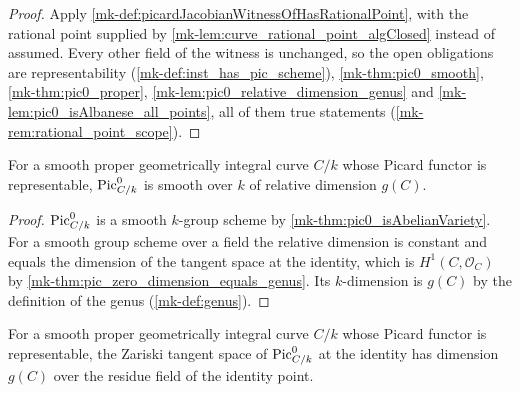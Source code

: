 \begin{proof}
  Apply \ref{mk-def:picardJacobianWitnessOfHasRationalPoint}, with the rational point
  supplied by \ref{mk-lem:curve_rational_point_algClosed} instead of assumed. Every
  other field of the witness is unchanged, so the open obligations are
  representability (\ref{mk-def:inst_has_pic_scheme}), \ref{mk-thm:pic0_smooth},
  \ref{mk-thm:pic0_proper}, \ref{mk-lem:pic0_relative_dimension_genus} and
  \ref{mk-lem:pic0_isAlbanese_all_points}, all of them true statements
  (\ref{mk-rem:rational_point_scope}).
\end{proof}

\begin{lemma}
  \label{mk-lem:pic0_relative_dimension_genus}

  For a smooth proper geometrically integral curve \(C/k\) whose Picard functor is
  representable, \(\operatorname{Pic}^0_{C/k}\) is smooth over \(k\) of relative dimension
  \(g(C)\).
\end{lemma}

\begin{proof}
  \(\operatorname{Pic}^0_{C/k}\) is a smooth \(k\)-group scheme by
  \ref{mk-thm:pic0_isAbelianVariety}. For a smooth group scheme over a field the
  relative dimension is constant and equals the dimension of the tangent space at
  the identity, which is \(H^1(C,\mathcal O_C)\) by
  \ref{mk-thm:pic_zero_dimension_equals_genus}. Its \(k\)-dimension is \(g(C)\) by
  the definition of the genus (\ref{mk-def:genus}).
\end{proof}

\begin{lemma}
  \label{mk-lem:pic0_tangent_dimension_genus}
  \leanok
  For a smooth proper geometrically integral curve \(C/k\) whose Picard functor is
  representable, the Zariski tangent space of \(\operatorname{Pic}^0_{C/k}\) at the identity has
  dimension \(g(C)\) over the residue field of the identity point.
\end{lemma}

